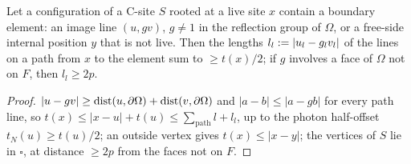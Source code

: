 \begin{lemma}\label{lem:a02:GEO}
Let a configuration of a C-site $S$ rooted at a live site $x$ contain a boundary element: an image line $(u,gv)$, $g\ne1$ in the reflection group of $\Omega$, or a free-side internal position $y$ that is not live. Then the lengths $l_l:=|u_l-g_lv_l|$ of the lines on a path from $x$ to the element sum to $\ge t(x)/2$; if $g$ involves a face of $\Omega$ not on $F$, then $l_l\ge2p$.
\end{lemma}
\begin{proof}
$|u-gv|\ge\operatorname{dist}(u,\partial\Omega)+\operatorname{dist}(v,\partial\Omega)$ and $|a-b|\le|a-gb|$ for every path line, so $t(x)\le|x-u|+t(u)\le\sum_{\text{path}}l+l_l$, up to the photon half-offset $t_N(u)\ge t(u)/2$; an outside vertex gives $t(x)\le|x-y|$; the vertices of $S$ lie in $\square$, at distance $\ge2p$ from the faces not on $F$.
\end{proof}

